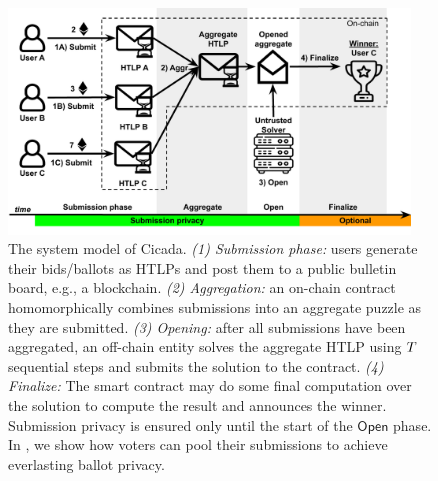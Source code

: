 \begin{figure}[tb]
    \centering
    \includegraphics[width=0.95\textwidth]{cicada/figs/cicada-explainer.pdf}
    \caption{The system model of Cicada. \emph{(1) Submission phase:} users generate their bids/ballots as HTLPs and post them to a public bulletin board, e.g., a blockchain. \emph{(2) Aggregation:} an on-chain contract homomorphically combines submissions into an aggregate puzzle as they are submitted. \emph{(3) Opening:} after all submissions have been aggregated, an off-chain entity solves the aggregate HTLP using $T$ sequential steps and submits the solution to the contract. \emph{(4) Finalize:} The smart contract may do some final computation over the solution to compute the result and announces the winner. Submission privacy is ensured only until the start of the $\mathsf{Open}$ phase. 
    In , we show how voters can pool their submissions to achieve everlasting ballot privacy.
    }
    \label{fig:cicada-explainer}
\end{figure}
